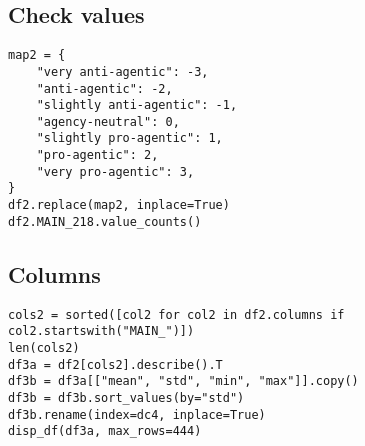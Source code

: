 \documentclass[a4paper,10pt,onecolumn,oneside,openright]{article}
\begin{document}
\subsection{Check values}
\label{sec:org4430e75}
\begin{verbatim}
map2 = {
    "very anti-agentic": -3,
    "anti-agentic": -2,
    "slightly anti-agentic": -1,
    "agency-neutral": 0,
    "slightly pro-agentic": 1,
    "pro-agentic": 2,
    "very pro-agentic": 3,
}
df2.replace(map2, inplace=True)
df2.MAIN_218.value_counts()
\end{verbatim}

\subsection{Columns}
\label{sec:org04bbc8a}
\begin{verbatim}
cols2 = sorted([col2 for col2 in df2.columns if col2.startswith("MAIN_")])
len(cols2)
df3a = df2[cols2].describe().T
df3b = df3a[["mean", "std", "min", "max"]].copy()
df3b = df3b.sort_values(by="std")
df3b.rename(index=dc4, inplace=True)
disp_df(df3a, max_rows=444)
\end{verbatim}
\end{document}
